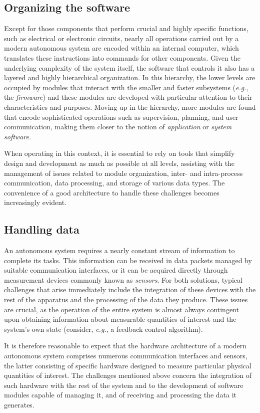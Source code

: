 \subsection{Organizing the software}
\label{sec:design_challenges_software}
Except for those components that perform crucial and highly specific functions, such as electrical or electronic circuits, nearly all operations carried out by a modern autonomous system are encoded within an internal computer, which translates these instructions into commands for other components. Given the underlying complexity of the system itself, the software that controls it also has a layered and highly hierarchical organization. In this hierarchy, the lower levels are occupied by modules that interact with the smaller and faster subsystems (\emph{e.g.}, the \emph{firmware}) and these modules are developed with particular attention to their characteristics and purposes. Moving up in the hierarchy, more modules are found that encode sophisticated operations such as supervision, planning, and user communication, making them closer to the notion of \emph{application} or \emph{system software}.

When operating in this context, it is essential to rely on tools that simplify design and development as much as possible at all levels, assisting with the management of issues related to module organization, inter- and intra-process communication, data processing, and storage of various data types. The convenience of a good architecture to handle these challenges becomes increasingly evident.

\subsection{Handling data}
\label{sec:design_challenges_data}
An autonomous system requires a nearly constant stream of information to complete its tasks. This information can be received in data packets managed by suitable communication interfaces, or it can be acquired directly through measurement devices commonly known as \emph{sensors}. For both solutions, typical challenges that arise immediately include the integration of these devices with the rest of the apparatus and the processing of the data they produce. These issues are crucial, as the operation of the entire system is almost always contingent upon obtaining information about measurable quantities of interest and the system's own state (consider, \emph{e.g.}, a feedback control algorithm).

It is therefore reasonable to expect that the hardware architecture of a modern autonomous system comprises numerous communication interfaces and sensors, the latter consisting of specific hardware designed to measure particular physical quantities of interest. The challenges mentioned above concern the integration of such hardware with the rest of the system and to the development of software modules capable of managing it, and of receiving and processing the data it generates.

